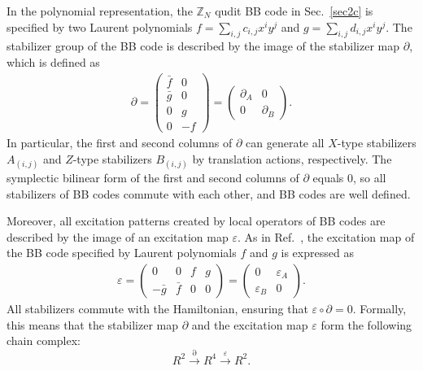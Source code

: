 \documentclass[aps,prb,english,superscriptaddress,twocolumn,tightenlines,showpacs,longbibliography,floatfix,amsfonts]{revtex4-2}
\newcommand{\eps}{\varepsilon}
\begin{document}
In the polynomial representation, the $\mathbb{Z}_N$ qudit BB code in Sec.~\ref{sec2c} is specified by two Laurent polynomials $f=\sum_{i,j}c_{i,j}x^iy^j$ and $g=\sum_{i,j}d_{i,j}x^iy^j$. The stabilizer group of the BB code is described by the image of the stabilizer map $\partial$, which is defined as 
\begin{align}
    \partial= \begin{pmatrix}
        \bar{f}&0 \\
        \bar{g}&0 \\
        0&g\\
        0&-f
        \end{pmatrix}=\begin{pmatrix}
            \partial_A&0 \\
            0&\partial_B
            \end{pmatrix}
        \label{eq:pial}.
\end{align}
In particular, the first and second columns of $\partial$ can generate all $X$-type stabilizers $A_{(i,j)}$ and $Z$-type stabilizers $B_{(i,j)}$ by translation actions, respectively. The symplectic bilinear form of the first and second columns of $\partial$ equals $0$, so all stabilizers of BB codes commute with each other, and BB codes are well defined.
  
Moreover, all excitation patterns created by local operators of BB codes are described by the image of an excitation map $\eps$. As in Ref.~\cite{Haah2013}, the excitation map of the BB code specified by Laurent polynomials $f$ and $g$ is expressed as
\begin{align}
    \eps=\begin{pmatrix}
        0&0&f&g\\
        -\bar{g}&\bar{f}&0&0
        \end{pmatrix}=\begin{pmatrix}
            0&\eps_A\\
            \eps_B&0
            \end{pmatrix}.
        \label{eq:eps}
\end{align}
All stabilizers commute with the Hamiltonian, ensuring that $\eps \circ\partial = 0$. Formally, this means that the stabilizer map $\partial$ and the excitation map $\eps$ form the following chain complex:  
\begin{equation}
    R^2\xrightarrow{\partial}R^4\xrightarrow{\eps}R^2.\label{eq:cc}
\end{equation}
\end{document}
